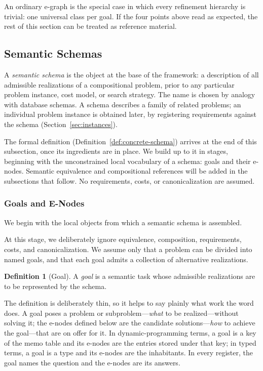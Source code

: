 \documentclass[sigconf,nonacm]{acmart}
\theoremstyle{definition}
\newtheorem{definition}{Definition}[section]
\theoremstyle{plain}
\theoremstyle{remark}
\begin{document}
An ordinary e-graph is the special case in which every refinement
hierarchy is trivial: one universal class per goal.  If the four
points above read as expected, the rest of this section can be
treated as reference material.

\subsection{Semantic Schemas}
\label{chap:schemas}
A \emph{semantic schema} is the object at the base of the framework:
a description of all admissible realizations of a compositional
problem, prior to any particular problem instance, cost model, or
search strategy.  The name is chosen by analogy with database
schemas.  A schema describes a family of related problems; an
individual problem instance is obtained later, by registering
requirements against the schema (Section~\ref{sec:instances}).

The formal definition (Definition~\ref{def:concrete-schema}) arrives
at the end of this subsection, once its ingredients are in place.
We build up to it in stages, beginning with the unconstrained local
vocabulary of a schema: goals and their e-nodes.  Semantic
equivalence and compositional references will be added in the
subsections that follow.  No requirements, costs, or
canonicalization are assumed.

\subsubsection{Goals and E-Nodes}
\label{sec:goals-enodes}

We begin with the local objects from which a semantic schema is
assembled.

At this stage, we deliberately ignore equivalence, composition,
requirements, costs, and canonicalization.  We assume only that a
problem can be divided into named goals, and that each goal admits a
collection of alternative realizations.

\begin{definition}[Goal]
A \emph{goal} is a semantic task whose admissible realizations are to
be represented by the schema.
\end{definition}

The definition is deliberately thin, so it helps to say plainly what
work the word does.  A goal poses a problem or subproblem---\emph{what}
to be realized---without
solving it; the e-nodes defined below are the candidate solutions---\emph{how}
to achieve the goal---that are on offer for it.  In dynamic-programming terms, a goal is a key of the
memo table and its e-nodes are the entries stored under that key; in
typed terms, a goal is a type and its e-nodes are the inhabitants.
In every register, the goal names the question and the e-nodes are
its answers.
\end{document}
